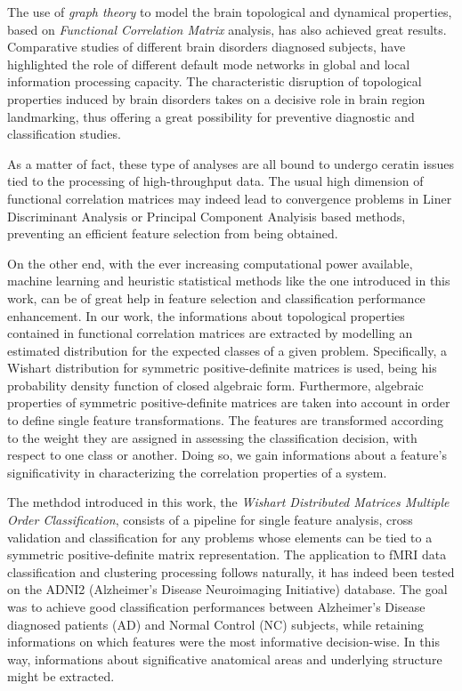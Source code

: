 \documentclass[12pt,openright,twoside,a4paper]{book}
\begin{document}
The use of \textit{graph theory} to model the brain topological and dynamical properties, based on \textit{Functional Correlation Matrix} analysis, has also achieved great results.
Comparative studies of different brain disorders diagnosed subjects, have highlighted the role of different default mode networks in global and local information processing capacity.
The characteristic disruption of topological properties induced by brain disorders takes on a decisive role in brain region landmarking, thus offering a great possibility for preventive diagnostic and classification studies.

As a matter of fact, these type of analyses are all bound to undergo ceratin issues tied to the  processing of high-throughput data.
The usual high dimension of functional correlation matrices may indeed lead to convergence problems in Liner Discriminant Analysis or Principal Component Analyisis based methods, preventing an efficient feature selection from being obtained.

On the other end, with the ever increasing computational power available, machine learning and heuristic statistical methods like the one introduced in this work, can be of great help in feature selection and classification performance enhancement.
In our work, the informations about topological properties contained in functional correlation matrices are extracted by modelling an estimated distribution for the expected classes of a given problem.
Specifically, a Wishart distribution for symmetric positive-definite matrices is used, being his probability density function of closed algebraic form.
Furthermore, algebraic properties of symmetric positive-definite matrices are taken into account in order to define single feature transformations.
The features are transformed according to the weight they are assigned in assessing the classification decision, with respect to one class or another.
Doing so, we gain informations about a feature's significativity in characterizing the correlation properties of a system.

The methdod introduced in this work, the \textit{Wishart Distributed Matrices Multiple Order Classification}, consists of a pipeline for single feature analysis, cross validation and classification for any problems whose elements can be tied to a symmetric positive-definite matrix representation.
The application to fMRI data classification and clustering processing follows naturally, it has indeed been tested on the ADNI2 (Alzheimer's Disease Neuroimaging Initiative) database.
The goal was to achieve good classification performances between  Alzheimer's Disease diagnosed patients (AD) and Normal Control (NC) subjects, while retaining informations on which features were the most informative decision-wise.
In this way, informations about significative anatomical areas and underlying structure might be extracted.
\end{document}
